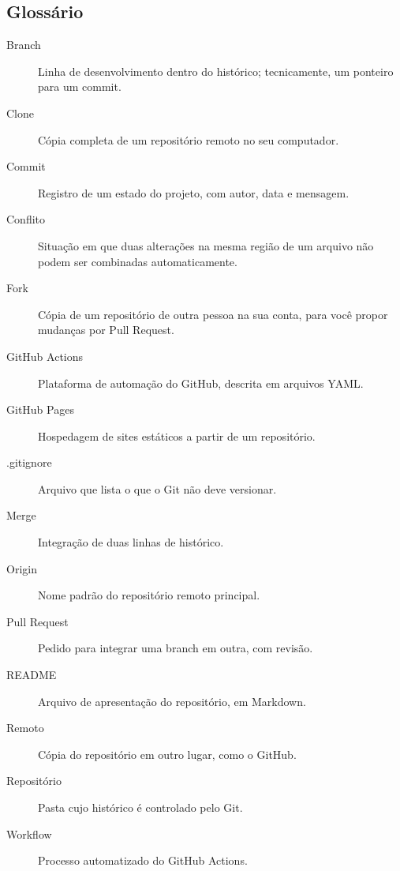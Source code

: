 \begin{apendicesenv}
\partapendices




\chapter{Glossário}
\label{ap:glossario}

\begin{description}
  \item[Branch] Linha de desenvolvimento dentro do histórico; tecnicamente, um
        ponteiro para um commit.
  \item[Clone] Cópia completa de um repositório remoto no seu computador.
  \item[Commit] Registro de um estado do projeto, com autor, data e mensagem.
  \item[Conflito] Situação em que duas alterações na mesma região de um
        arquivo não podem ser combinadas automaticamente.
  \item[Fork] Cópia de um repositório de outra pessoa na sua conta, para você
        propor mudanças por Pull Request.
  \item[GitHub Actions] Plataforma de automação do GitHub, descrita em
        arquivos YAML.
  \item[GitHub Pages] Hospedagem de sites estáticos a partir de um
        repositório.
  \item[.gitignore] Arquivo que lista o que o Git não deve versionar.
  \item[Merge] Integração de duas linhas de histórico.
  \item[Origin] Nome padrão do repositório remoto principal.
  \item[Pull Request] Pedido para integrar uma branch em outra, com revisão.
  \item[README] Arquivo de apresentação do repositório, em Markdown.
  \item[Remoto] Cópia do repositório em outro lugar, como o GitHub.
  \item[Repositório] Pasta cujo histórico é controlado pelo Git.
  \item[Workflow] Processo automatizado do GitHub Actions.
\end{description}

\end{apendicesenv}
